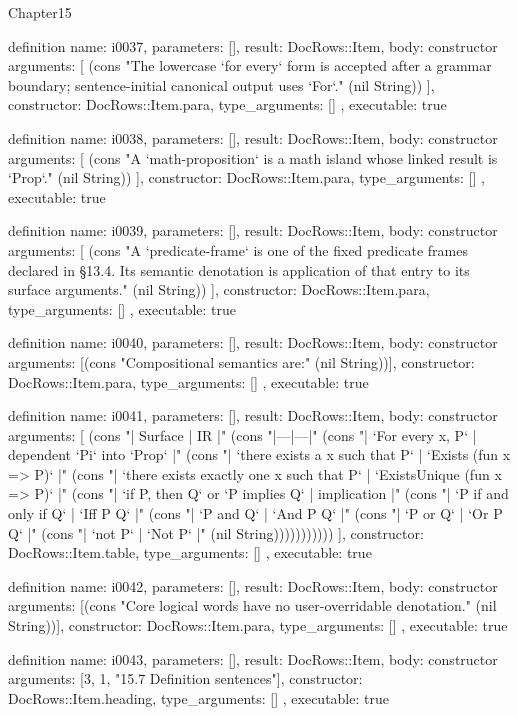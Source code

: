 \begin{lexlean}{Chapter15}
\begin{semanticmodule}
definition{
  name: i0037,
  parameters: [],
  result: DocRows::Item,
  body: constructor{
    arguments: [
      (cons "The lowercase `for every` form is accepted after a grammar boundary; sentence-initial canonical output uses `For`." (nil String))
    ],
    constructor: DocRows::Item.para,
    type_arguments: []
  },
  executable: true
}

definition{
  name: i0038,
  parameters: [],
  result: DocRows::Item,
  body: constructor{
    arguments: [
      (cons "A `math-proposition` is a math island whose linked result is `Prop`." (nil String))
    ],
    constructor: DocRows::Item.para,
    type_arguments: []
  },
  executable: true
}

definition{
  name: i0039,
  parameters: [],
  result: DocRows::Item,
  body: constructor{
    arguments: [
      (cons "A `predicate-frame` is one of the fixed predicate frames declared in §13.4. Its semantic denotation is application of that entry to its surface arguments." (nil String))
    ],
    constructor: DocRows::Item.para,
    type_arguments: []
  },
  executable: true
}

definition{
  name: i0040,
  parameters: [],
  result: DocRows::Item,
  body: constructor{
    arguments: [(cons "Compositional semantics are:" (nil String))],
    constructor: DocRows::Item.para,
    type_arguments: []
  },
  executable: true
}

definition{
  name: i0041,
  parameters: [],
  result: DocRows::Item,
  body: constructor{
    arguments: [
      (cons "| Surface | IR |" (cons "|---|---|" (cons "| `For every x, P` | dependent `Pi` into `Prop` |" (cons "| `there exists a x such that P` | `Exists (fun x => P)` |" (cons "| `there exists exactly one x such that P` | `ExistsUnique (fun x => P)` |" (cons "| `if P, then Q` or `P implies Q` | implication |" (cons "| `P if and only if Q` | `Iff P Q` |" (cons "| `P and Q` | `And P Q` |" (cons "| `P or Q` | `Or P Q` |" (cons "| `not P` | `Not P` |" (nil String)))))))))))
    ],
    constructor: DocRows::Item.table,
    type_arguments: []
  },
  executable: true
}

definition{
  name: i0042,
  parameters: [],
  result: DocRows::Item,
  body: constructor{
    arguments: [(cons "Core logical words have no user-overridable denotation." (nil String))],
    constructor: DocRows::Item.para,
    type_arguments: []
  },
  executable: true
}

definition{
  name: i0043,
  parameters: [],
  result: DocRows::Item,
  body: constructor{
    arguments: [3, 1, "15.7 Definition sentences"],
    constructor: DocRows::Item.heading,
    type_arguments: []
  },
  executable: true
}


\end{semanticmodule}
\end{lexlean}
